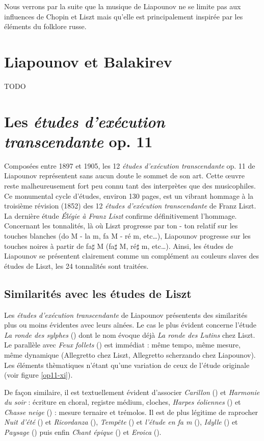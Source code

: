 Nous verrons par la suite que la musique de Liapounov ne se limite pas aux influences de Chopin et Liszt mais qu'elle est principalement inspirée par les éléments du folklore russe.

\section{Liapounov et Balakirev}

TODO

\newpage
\newpage

\section{Les \emph{études d'exécution transcendante} op. 11}

Composées entre 1897 et 1905, les 12 \emph{études d'exécution transcendante} op. 11 de Liapounov représentent sans aucun doute le sommet de son art. Cette œuvre reste malheureusement fort peu connu tant des interprètes que des musicophiles. Ce monumental cycle d'études, environ 130 pages, est un vibrant hommage à la troisième révision (1852) des 12 \emph{études d'exécution transcendante} de Franz Liszt. La dernière étude \emph{Élégie à Franz Liszt} confirme définitivement l'hommage. Concernant les tonnalités, là où Liszt progresse par ton - ton relatif sur les touches blanches (do M - la m, fa M - ré m, etc\ldots), Liapounov progresse sur les touches noires à partir de fa$\sharp$ M (fa$\sharp$ M, ré$\sharp$ m, etc\ldots). Ainsi, les études de Liapounov se présentent clairement comme un complément au couleurs slaves des études de Liszt, les 24 tonnalités sont traitées.

\subsection{Similarités avec les études de Liszt}

Les \emph{études d'exécution transcendante} de Liapounov présentents des similarités plus ou moins évidentes avec leurs aînées. Le cas le plus évident concerne l'étude \emph{La ronde des sylphes} () dont le nom évoque déjà \emph{La ronde des Lutins} chez Liszt. Le parallèle avec \emph{Feux follets} () est immédiat : même tempo, même mesure, même dynamique (Allegretto chez Liszt, Allegretto scherzando chez Liapounov). Les éléments thèmatiques n'étant qu'une variation de ceux de l'étude originale (voir figure \ref{op11-xi}).

De façon similaire, il est textuellement évident d'associer \emph{Carillon} () et \emph{Harmonie du soir} : écriture en choral, registre médium, cloches, \emph{Harpes éoliennes} () et \emph{Chasse neige} () : mesure ternaire et trémolos. Il est de plus légitime de raprocher \emph{Nuit d'été} () et \emph{Ricordanza} (), \emph{Tempête} () et \emph{l'étude en fa m} (), \emph{Idylle} () et \emph{Paysage} () puis enfin \emph{Chant épique} () et \emph{Eroica} ().


